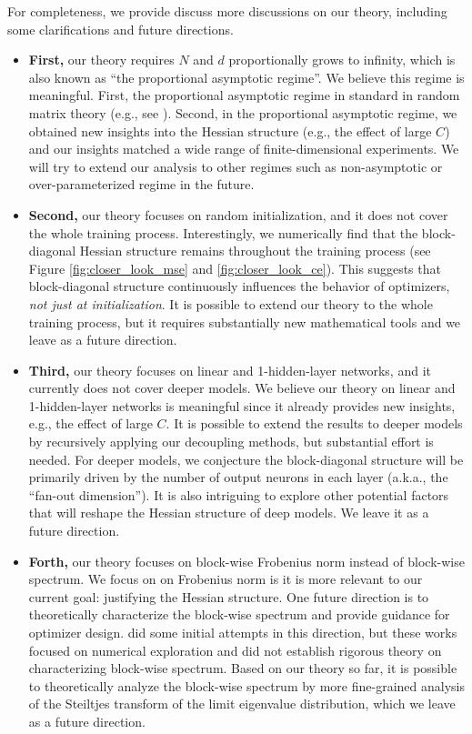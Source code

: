 \documentclass{article}
\newcommand{\1}{^{(1)}}
\newcommand{\2}{^{(2)}}
\begin{document}
For completeness, we provide discuss more discussions on our theory, including some clarifications and future directions. 


\begin{itemize}
[topsep=1pt,parsep=1pt,partopsep=1pt, leftmargin=*]
\item {\bf First,} our theory requires $N$ and $d$ proportionally grows to infinity, which is also known as  ``the proportional asymptotic regime''.  We believe this regime is meaningful. First, the proportional asymptotic regime in standard in random matrix theory (e.g., see \citep{wigner1958distribution,tao2012topics}). Second, in the proportional asymptotic regime, we obtained new insights into the Hessian structure (e.g., the effect of large $C$) and our insights matched a wide range of finite-dimensional experiments.  We will try to extend our analysis to other regimes such as non-asymptotic or over-parameterized regime in the future. 
\item {\bf Second,} our theory focuses on random initialization, and it does not cover the whole training process.   Interestingly, we numerically find that the block-diagonal Hessian structure remains throughout the training process (see  Figure \ref{fig:closer_look_mse} and \ref{fig:closer_look_ce}). This suggests that block-diagonal structure continuously influences the behavior of optimizers, {\it not just at initialization}.  It is possible to extend our theory to the whole training process, but it requires substantially new mathematical tools and we leave as a future direction.  


\item {\bf Third,} our theory focuses on linear and 1-hidden-layer networks, and it currently does not cover deeper models. We believe our theory on linear and 1-hidden-layer networks is meaningful since it already provides new insights, e.g., the effect of large $C$.   It is possible to extend the results to deeper models by recursively applying our decoupling methods, but substantial effort is needed. For deeper models, we conjecture the block-diagonal structure will be primarily driven by the number of output neurons in each layer (a.k.a., the ``fan-out dimension''). It is also intriguing to explore other potential factors that will reshape the Hessian structure of deep models. We leave it as a future direction. 

\item {\bf Forth,} our theory focuses on block-wise Frobenius norm instead of block-wise spectrum. We focus on on Frobenius norm is it is more relevant to our current goal:  justifying the Hessian structure. One future direction is to theoretically characterize the block-wise spectrum and provide guidance for optimizer design. \citet{zhang2024transformers,zhang2024adam,wang2025sharpness} did some initial attempts in this direction, but these works focused on numerical exploration and did not establish rigorous theory on characterizing block-wise spectrum. Based on our theory so far, it is possible to theoretically analyze the block-wise spectrum by more fine-grained analysis of the Steiltjes transform of the limit eigenvalue distribution, which we leave as a future direction.


\end{itemize}
\end{document}
